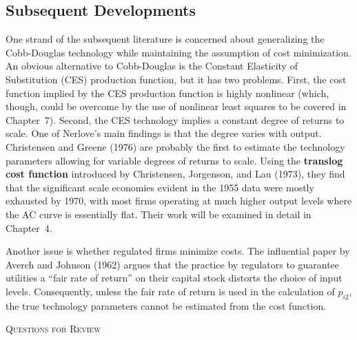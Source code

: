 \subsection*{Subsequent Developments}

One strand of the subsequent literature is concerned about generalizing the Cobb-Douglas
technology while maintaining the assumption of cost minimization.  An obvious alternative
to Cobb-Douglas is the Constant Elasticity of Substitution (CES) production function,
but it has two problems.  First, the cost function implied by the CES production function
is highly nonlinear (which, though, could be overcome by the use of nonlinear least
squares to be covered in Chapter~7).  Second, the CES technology implies a constant
degree of returns to scale.  One of Nerlove's main findings is that the degree varies
with output.  Christensen and Greene (1976) are probably the first to estimate the
technology parameters allowing for variable degrees of returns to scale.  Using the
\textbf{translog cost function} introduced by Christensen, Jorgenson, and Lau (1973),
they find that the significant scale economies evident in the 1955 data were mostly
exhausted by 1970, with most firms operating at much higher output levels where the AC
curve is essentially flat.  Their work will be examined in detail in Chapter~4.

Another issue is whether regulated firms minimize costs.  The influential paper by
Averch and Johnson (1962) argues that the practice by regulators to guarantee utilities
a ``fair rate of return'' on their capital stock distorts the choice of input levels.
Consequently, unless the fair rate of return is used in the calculation of $p_{i2}$, the
true technology parameters cannot be estimated from the cost function.

\medskip\noindent
\textsc{Questions for Review}

